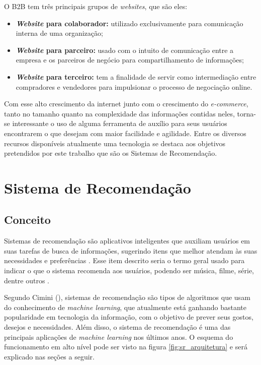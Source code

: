 O B2B tem três principais grupos de \textit{websites}, que são eles:
\begin{itemize}
    \item \textbf{\textit{Website} para colaborador:} utilizado exclusivamente para comunicação interna de uma organização;
    
    \item \textbf{\textit{Website} para parceiro:} usado com o intuito de comunicação entre a empresa e os parceiros de negócio para compartilhamento de informações;
    
    \item \textbf{\textit{Website} para terceiro:} tem a finalidade de servir como intermediação entre compradores e vendedores para impulsionar o processo de negociação online.
    
\end{itemize}

Com esse alto crescimento da internet junto com o crescimento do \textit{e-commerce}, tanto no tamanho quanto na complexidade das informações contidas neles, torna-se interessante o uso de alguma ferramenta de auxílio para seus usuários encontrarem o que desejam com maior facilidade e agilidade. Entre os diversos recursos disponíveis atualmente uma tecnologia se destaca aos objetivos pretendidos por este trabalho que são os Sistemas de Recomendação.

\section{Sistema de Recomendação}
\label{SR}

\subsection{Conceito}

Sistemas de recomendação são aplicativos inteligentes que auxiliam usuários em suas tarefas de busca de informações, sugerindo itens que melhor atendam às suas necessidades e preferências \cite{Mahmood:2009:IRS:1557914.1557930}. Esse item descrito seria o termo geral usado para indicar o que o sistema recomenda aos usuários, podendo ser música, filme, série, dentre outros \cite{Ricci:2010}.

Segundo Cimini (\citeyear{Cimini:2019}), sistemas de recomendação são tipos de algoritmos que usam do conhecimento de \textit{machine learning}, que atualmente está ganhando bastante popularidade em tecnologia da informação, com o objetivo de prever seus gostos, desejos e necessidades. Além disso, o sistema de recomendação é uma das principais aplicações de \textit{machine learning} nos últimos anos. O esquema do funcionamento em alto nível pode ser visto na figura \ref{fig:sr_arquitetura} e será explicado nas seções a seguir.


